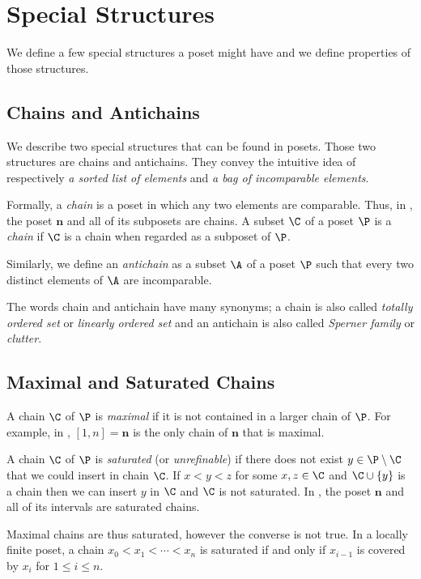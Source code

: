 \section{Special Structures}

We define a few special structures a poset might have and we define properties
of those structures.

\subsection{Chains and Antichains}

We describe two special structures that can be found in
posets. Those two structures are chains and antichains.
They convey the intuitive idea of respectively \emph{a sorted list of
elements} and \emph{a bag of incomparable elements}.

Formally, a \emph{chain} is a poset in which any two elements are
comparable. Thus, in , the poset $\bm{n}$ and all of its
subposets are chains. A subset $\C$ of a poset $\P$ is a \emph{chain} if $\C$ is a
chain when regarded as a subposet of $\P$.

Similarly, we define an \emph{antichain} as a subset $\A$ of a poset $\P$ such
that every two distinct elements of $\A$ are incomparable.

The words chain and antichain have many synonyms; a chain is also called
\emph{totally ordered set} or \emph{linearly ordered set} and an
antichain is also called \emph{Sperner family} or \emph{clutter}.

\subsection{Maximal and Saturated Chains}

A chain \(\C\) of \(\P\) is \emph{maximal} if it is not contained in a larger
chain of $\P$. For example, in , $[1, n] = \bm{n}$ is the
only chain of $\bm{n}$ that is maximal.

A chain $\C$ of $\P$ is \emph{saturated} (or \emph{unrefinable}) if there does not exist
$y \in \P \setminus \C$ that we could insert in chain $\C$. If $x < y < z$ for
some $x, z \in \C$ and $\C \cup \left\{{y}\right\}$ is a chain then we can insert
$y$ in $\C$ and $\C$ is not saturated. In , the poset
$\bm{n}$ and all of its intervals are saturated chains.

Maximal chains are thus saturated, however the converse is not true. In a
locally finite poset, a chain $x_0 < x_1 < \cdots < x_n$ is saturated if and
only if $x_{i-1}$ is covered by $x_i$ for $1 \le i \le n$.


